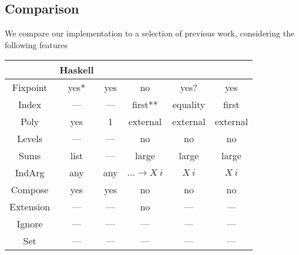 

\subsection{Comparison}
We compare our implementation to a selection of previous work, considering the following features


\begin{tabular}{c | c c c c c}
             & Haskell        & \cite{initenough} & \cite{levitation} & \cite{algorn} & \cite{progorn} \\
    \hline                                                                                             
    Fixpoint & yes*           & yes               & no                & yes?          & yes            \\
    Index    & —              & —                 & first**           & equality      & first          \\
    Poly     & yes            & 1                 & external          & external      & external       \\
    Levels   & —              & —                 & no                & no            & no             \\
    Sums     & list           & —                 & large             & large         & large          \\
    IndArg   & any            & any               & $\dots \to X\ i$  & $X\ i$        & $X\ i$         \\
    Compose  & yes            & yes               & no                & no            & no             \\
    Extension& —              & —                 & no                & —             & —              \\
    Ignore   & —              & —                 & —                 & —             & —              \\
    Set      & —              & —                 & —                 & —             & —              \\
\end{tabular}


